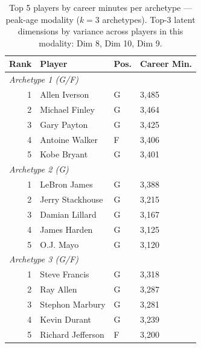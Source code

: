 \begin{table}[htbp]
  \centering\small
  \begin{tabular}{rlll}
    \toprule
    Rank & Player & Pos. & Career Min. \\
    \midrule
    \multicolumn{4}{l}{\textit{Archetype 1 (G/F)}} \\
    \midrule
    1 & Allen Iverson & G & 3,485 \\
    2 & Michael Finley & G & 3,464 \\
    3 & Gary Payton & G & 3,425 \\
    4 & Antoine Walker & F & 3,406 \\
    5 & Kobe Bryant & G & 3,401 \\
    \midrule[0.4pt]
    \multicolumn{4}{l}{\textit{Archetype 2 (G)}} \\
    \midrule
    1 & LeBron James & G & 3,388 \\
    2 & Jerry Stackhouse & G & 3,215 \\
    3 & Damian Lillard & G & 3,167 \\
    4 & James Harden & G & 3,125 \\
    5 & O.J. Mayo & G & 3,120 \\
    \midrule[0.4pt]
    \multicolumn{4}{l}{\textit{Archetype 3 (G/F)}} \\
    \midrule
    1 & Steve Francis & G & 3,318 \\
    2 & Ray Allen & G & 3,287 \\
    3 & Stephon Marbury & G & 3,281 \\
    4 & Kevin Durant & G & 3,239 \\
    5 & Richard Jefferson & F & 3,200 \\
    \bottomrule
  \end{tabular}
  \caption{Top 5 players by career minutes per archetype --- peak-age modality ($k=3$ archetypes). Top-3 latent dimensions by variance across players in this modality: Dim 8, Dim 10, Dim 9.}
  \label{tab:arch_reps_peak_age}
\end{table}

